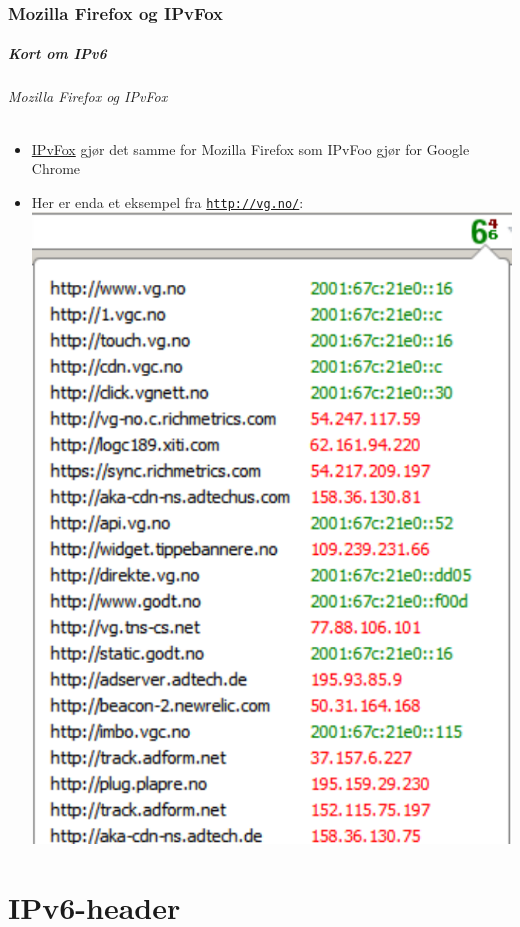 \section{Mozilla Firefox og IPvFox}
\begin{frame}%
  \frametitle{Kort om IPv6}
  \framesubtitle{Mozilla Firefox og IPvFox}
  \pause
  \begin{itemize}[<+->]
  \item
    \href{https://addons.mozilla.org/en-US/firefox/addon/ipvfox/}{IPvFox}
    gjør det samme for Mozilla Firefox som IPvFoo gjør for Google
    Chrome
  \item Her er enda et eksempel fra \texttt{\url{http://vg.no/}}:\\
  \includegraphics[scale=.4]{vg-dot-no-og-IPvFox-i-Mozilla-Firefox-forkortet.pdf}
  \end{itemize}
\end{frame}

\part{IPv6-header}

